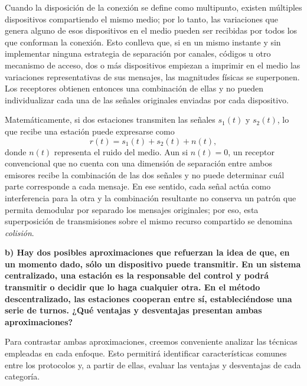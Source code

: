 \documentclass[11pt,a4paper]{article}
\begin{document}
Cuando la disposición de la conexión se define como multipunto, existen múltiples dispositivos compartiendo el mismo medio; por lo tanto, las variaciones que genera alguno de esos dispositivos en el medio pueden ser recibidas por todos los que conforman la conexión. Esto conlleva que, si en un mismo instante y sin implementar ninguna estrategia de separación por canales, códigos u otro mecanismo de acceso, dos o más dispositivos empiezan a imprimir en el medio las variaciones representativas de sus mensajes, las magnitudes físicas se superponen. Los receptores obtienen entonces una combinación de ellas y no pueden individualizar cada una de las señales originales enviadas por cada dispositivo.

Matemáticamente, si dos estaciones transmiten las señales $s_1(t)$ y $s_2(t)$, lo que recibe una estación puede expresarse como
\[
  r(t)=s_1(t)+s_2(t)+n(t),
\]
donde $n(t)$ representa el ruido del medio. Aun si $n(t)=0$, un receptor convencional que no cuenta con una dimensión de separación entre ambos emisores recibe la combinación de las dos señales y no puede determinar cuál parte corresponde a cada mensaje. En ese sentido, cada señal actúa como interferencia para la otra y la combinación resultante no conserva un patrón que permita demodular por separado los mensajes originales; por eso, esta superposición de transmisiones sobre el mismo recurso compartido se denomina \textit{colisión}.\par

\vspace{0.3cm}
\noindent\textbf{b) Hay dos posibles aproximaciones que refuerzan la idea de que, en un momento dado, sólo un dispositivo puede transmitir. En un sistema centralizado, una estación es la responsable del control y podrá transmitir o decidir que lo haga cualquier otra. En el método descentralizado, las estaciones cooperan entre sí, estableciéndose una serie de turnos. ¿Qué ventajas y desventajas presentan ambas aproximaciones?}\par
Para contrastar ambas aproximaciones, creemos conveniente analizar las técnicas empleadas en cada enfoque. Esto permitirá identificar características comunes entre los protocolos y, a partir de ellas, evaluar las ventajas y desventajas de cada categoría.\par
\end{document}
